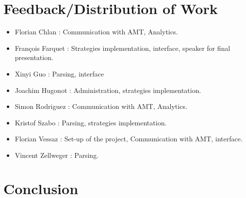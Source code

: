 \documentclass{article}
\begin{document}
\section{Feedback/Distribution of Work} %
\begin{itemize}
\item Florian Chlan : Communication with AMT, Analytics.
\item François Farquet : Strategies implementation, interface, speaker for final presentation.
\item Xinyi Guo : Parsing, interface
\item Joachim Hugonot : Administration, strategies implementation.
\item Simon Rodriguez : Communication with AMT, Analytics.
\item Kristof Szabo : Parsing, strategies implementation. 
\item Florian Vessaz : Set-up of the project, Communication with AMT, interface.
\item Vincent Zellweger : Parsing.
\end{itemize}
\section{Conclusion}
\end{document}
